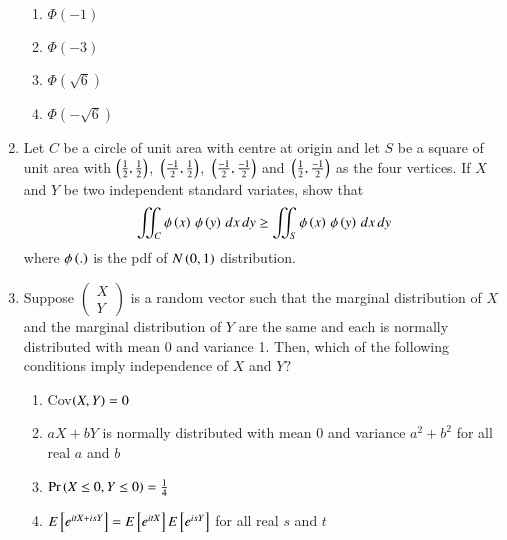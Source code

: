 \begin{enumerate}[label=\thesection.\arabic*.,ref=\thesection.\theenumi]
\begin{enumerate}
    \item $\Phi(-1)$
    \item $\Phi(-3)$
    \item $\Phi(\sqrt{6})$
    \item $\Phi(-\sqrt{6})$
\end{enumerate}
\solution

%
\item Let $C$ be a circle of unit area with centre at origin and let $S$ be a square of unit area with $\left(\frac{1}{2},\frac{1}{2}\right)$, $\,\left(\frac{-1}{2},\frac{1}{2}\right)$, $\,\left(\frac{-1}{2},\frac{-1}{2}\right)$ and $\,\left(\frac{1}{2},\frac{-1}{2}\right)$ as the four vertices. If $X$ and $Y$ be two independent standard variates, show that
\begin{align*}
    \iint_C{\phi\left(x\right)\,\phi\left(y\right)\,dx\,dy} \geq \iint_S{\phi\left(x\right)\,\phi\left(y\right)\,dx\,dy}
\end{align*}
where $\phi\left(.\right)$ is the pdf of $N\left(0,1\right)$ distribution.
\solution



\item Suppose
$\begin{pmatrix}
X\\
Y
\end{pmatrix}$ is a random vector such that the marginal distribution of $X$ and the marginal distribution of $Y$ are the same and each is normally distributed with mean 0 and variance 1. Then, which of the following conditions imply independence of $X$ and $Y?$
\begin{enumerate}
\item Cov$\left(X,Y\right)=0$
\item $aX+bY$ is normally distributed with mean 0 and variance $a^2+b^2$ for all real $a$ and $b$
\item $\Pr\left(X\le 0, Y\le 0\right)=\frac{1}{4}$
\item $E{}\left[e^{itX+isY}\right]=E{}\left[e^{itX}\right]E{}\left[e^{isY}\right]$ for all real $s$ and $t$
\end{enumerate}
%
\solution


\end{enumerate}